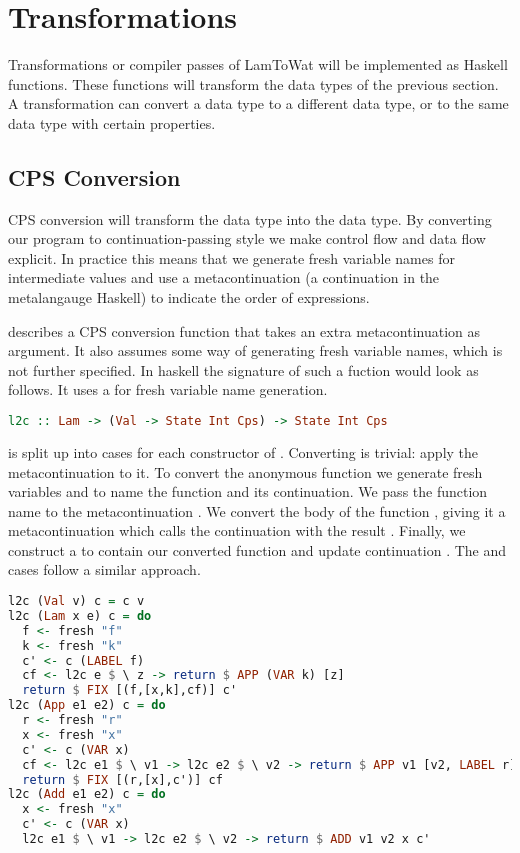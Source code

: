 {\section{\label{section:transforms}Transformations}
Transformations or compiler passes of LamToWat will be implemented as Haskell functions. These functions will transform the data types of the previous section. A transformation can convert a data type to a different data type, or to the same data type with certain properties.

\subsection{\label{subsection:cpsconvert}CPS Conversion}
CPS conversion will transform the  data type into the  data type. By converting our program to continuation-passing style we make control flow and data flow explicit. In practice this means that we generate fresh variable names for intermediate values and use a metacontinuation (a continuation in the metalangauge Haskell) to indicate the order of expressions.

\citeauthor{DBLP:books/daglib/0022396} describes a CPS conversion function that takes an extra metacontinuation as argument. It also assumes some way of generating fresh variable names, which is not further specified. In haskell the signature of such a fuction would look as follows. It uses a  for fresh variable name generation.

\begin{lstlisting}[language=Haskell]
l2c :: Lam -> (Val -> State Int Cps) -> State Int Cps
\end{lstlisting}

 is split up into cases for each constructor of . Converting  is trivial: apply the metacontinuation  to it. To convert the anonymous function  we generate fresh variables  and  to name the function and its continuation. We pass the function name to the metacontinuation . We convert the body of the function , giving it a metacontinuation which calls the continuation with the result . Finally, we construct a  to contain our converted function and update continuation . The  and  cases follow a similar approach.

\begin{lstlisting}[language=Haskell]
l2c (Val v) c = c v
l2c (Lam x e) c = do
  f <- fresh "f"
  k <- fresh "k"
  c' <- c (LABEL f)
  cf <- l2c e $ \ z -> return $ APP (VAR k) [z]
  return $ FIX [(f,[x,k],cf)] c'
l2c (App e1 e2) c = do
  r <- fresh "r"
  x <- fresh "x"
  c' <- c (VAR x)
  cf <- l2c e1 $ \ v1 -> l2c e2 $ \ v2 -> return $ APP v1 [v2, LABEL r]
  return $ FIX [(r,[x],c')] cf
l2c (Add e1 e2) c = do
  x <- fresh "x"
  c' <- c (VAR x)
  l2c e1 $ \ v1 -> l2c e2 $ \ v2 -> return $ ADD v1 v2 x c'
\end{lstlisting}

}
